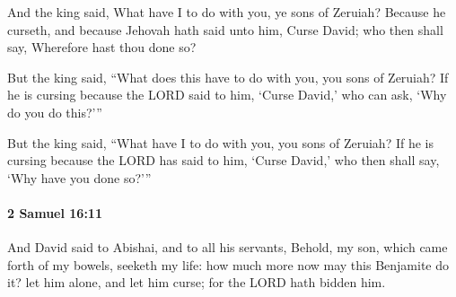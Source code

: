 			\begin{versebox}
					\item[BHS] 
					\item[ASV] And the king said, What have I to do with you, ye sons of Zeruiah? Because he curseth, and because Jehovah hath said unto him, Curse David; who then shall say, Wherefore hast thou done so?
					\item[NIV] But the king said, “What does this have to do with you, you sons of Zeruiah? If he is cursing because the LORD said to him, ‘Curse David,’ who can ask, ‘Why do you do this?’”
					\item[NRSV] But the king said, “What have I to do with you, you sons of Zeruiah? If he is cursing because the LORD has said to him, ‘Curse David,’ who then shall say, ‘Why have you done so?’”
			\end{versebox}

		\paragraph{2 Samuel 16:11} %
			\label{2SAMUEL-16-11}

			And David said to Abishai, and to all his servants, Behold, my son, which came forth of my bowels, seeketh my life: how much more now may this Benjamite do it? let him alone, and let him curse; for the LORD hath bidden him.

